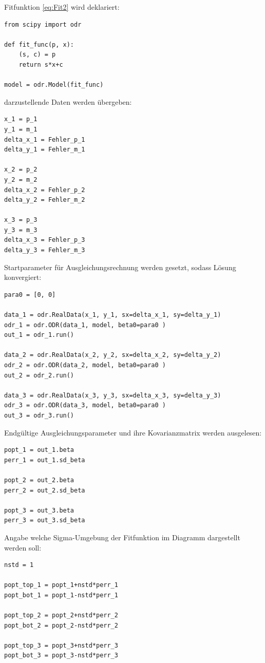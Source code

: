 \documentclass[a4paper,10pt]{article}
\begin{document}
Fitfunktion \eqref{eq:Fit2} wird deklariert:\begin{lstlisting}
from scipy import odr

def fit_func(p, x):
    (s, c) = p 
    return s*x+c

model = odr.Model(fit_func)

\end{lstlisting}

darzustellende Daten werden übergeben:\begin{lstlisting}
x_1 = p_1
y_1 = m_1
delta_x_1 = Fehler_p_1
delta_y_1 = Fehler_m_1

x_2 = p_2
y_2 = m_2
delta_x_2 = Fehler_p_2
delta_y_2 = Fehler_m_2

x_3 = p_3
y_3 = m_3
delta_x_3 = Fehler_p_3
delta_y_3 = Fehler_m_3

\end{lstlisting}

Startparameter für Ausgleichungsrechnung werden gesetzt, sodass Lösung konvergiert:\begin{lstlisting}
para0 = [0, 0]

data_1 = odr.RealData(x_1, y_1, sx=delta_x_1, sy=delta_y_1)
odr_1 = odr.ODR(data_1, model, beta0=para0 )
out_1 = odr_1.run()

data_2 = odr.RealData(x_2, y_2, sx=delta_x_2, sy=delta_y_2)
odr_2 = odr.ODR(data_2, model, beta0=para0 )
out_2 = odr_2.run()

data_3 = odr.RealData(x_3, y_3, sx=delta_x_3, sy=delta_y_3)
odr_3 = odr.ODR(data_3, model, beta0=para0 )
out_3 = odr_3.run()

\end{lstlisting}

Endgültige Ausgleichungsparameter und ihre Kovarianzmatrix werden ausgelesen:\begin{lstlisting}
popt_1 = out_1.beta
perr_1 = out_1.sd_beta

popt_2 = out_2.beta
perr_2 = out_2.sd_beta

popt_3 = out_3.beta
perr_3 = out_3.sd_beta

\end{lstlisting}

Angabe welche Sigma-Umgebung der Fitfunktion im Diagramm dargestellt werden soll:\begin{lstlisting}
nstd = 1 

popt_top_1 = popt_1+nstd*perr_1
popt_bot_1 = popt_1-nstd*perr_1

popt_top_2 = popt_2+nstd*perr_2
popt_bot_2 = popt_2-nstd*perr_2

popt_top_3 = popt_3+nstd*perr_3
popt_bot_3 = popt_3-nstd*perr_3

\end{lstlisting}
\end{document}
